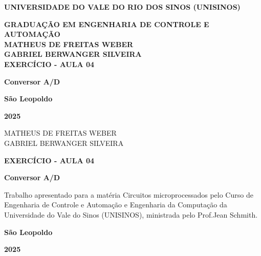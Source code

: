 \documentclass[12pt, a4paper]{article}
\date{\today}
\newcommand\studentName{Matheus de Freitas Weber}
\newcommand\studentTwoName{Gabriel Berwanger Silveira}
\newcommand\courseName{Circuitos microprocessados}
\newcommand\titleName{Exercício - Aula 04}
\newcommand\subTitleName{Conversor A/D}
\newcommand\teacherName{Jean Schmith}
\begin{document}
\begin{center}
	\MakeUppercase{\textbf{Universidade do Vale do Rio dos Sinos (Unisinos)}}

	\MakeUppercase{\textbf{Graduação em Engenharia de controle e automação}} \\[16ex]


	\MakeUppercase{\textbf{\studentName}}
	\\
	\MakeUppercase{\textbf{\studentTwoName}}
	\\[16ex]

	\MakeUppercase{\textbf{\titleName}}

	\textbf{\subTitleName}

	\vfill

	\textbf{São Leopoldo}

	\textbf{2025}

	\thispagestyle{empty}
\end{center}
\newpage

\begin{center}
	\vspace*{28ex}
	\MakeUppercase{\studentName}
	\\
	\MakeUppercase{\studentTwoName}
	\vspace*{16ex}

	\MakeUppercase{\textbf{\titleName}}

	\textbf{\subTitleName}

	\vspace*{8ex}

	\hfill\begin{minipage}{0.5\linewidth}
		Trabalho apresentado para a matéria {\courseName} pelo Curso de Engenharia de Controle e Automação e Engenharia da Computação da Universidade do Vale do Sinos (UNISINOS), ministrada pelo Prof.\teacherName.
	\end{minipage}
	\vfill

	\textbf{São Leopoldo}

	\textbf{2025}

\end{center}
\thispagestyle{empty}
\setcounter{page}{1}

\newpage
\begin{center}
	\tableofcontents
\end{center}
\thispagestyle{empty}

\newpage
\end{document}
